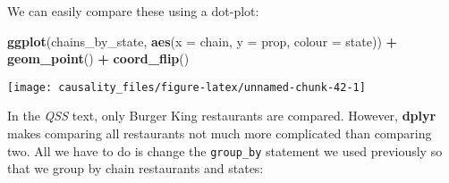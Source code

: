 \documentclass[]{book}
\newenvironment{Shaded}{\begin{snugshade}}{\end{snugshade}}
\newcommand{\CommentTok}[1]{\textcolor[rgb]{0.56,0.35,0.01}{\textit{#1}}}
\newcommand{\DataTypeTok}[1]{\textcolor[rgb]{0.13,0.29,0.53}{#1}}
\newcommand{\KeywordTok}[1]{\textcolor[rgb]{0.13,0.29,0.53}{\textbf{#1}}}
\newcommand{\NormalTok}[1]{#1}
\newcommand{\OperatorTok}[1]{\textcolor[rgb]{0.81,0.36,0.00}{\textbf{#1}}}
\newcommand{\StringTok}[1]{\textcolor[rgb]{0.31,0.60,0.02}{#1}}
\theoremstyle{definition}
\theoremstyle{definition}
\theoremstyle{definition}
\theoremstyle{remark}
\begin{document}
\begin{Shaded}
\end{Shaded}

We can easily compare these using a dot-plot:

\begin{Shaded}
\begin{Highlighting}[]
\KeywordTok{ggplot}\NormalTok{(chains_by_state, }\KeywordTok{aes}\NormalTok{(}\DataTypeTok{x =}\NormalTok{ chain, }\DataTypeTok{y =}\NormalTok{ prop, }\DataTypeTok{colour =}\NormalTok{ state)) }\OperatorTok{+}
\StringTok{  }\KeywordTok{geom_point}\NormalTok{() }\OperatorTok{+}
\StringTok{  }\KeywordTok{coord_flip}\NormalTok{()}
\end{Highlighting}
\end{Shaded}

\begin{center}\texttt{[image: causality\_files/figure-latex/unnamed-chunk-42-1]} \end{center}

In the \emph{QSS} text, only Burger King restaurants are compared.
However, \textbf{dplyr} makes comparing all restaurants not much more
complicated than comparing two. All we have to do is change the
\texttt{group\_by} statement we used previously so that we group by
chain restaurants and states:

\begin{Shaded}
\end{Shaded}
\end{document}
